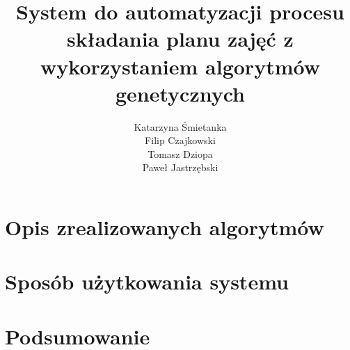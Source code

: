 \documentclass[11pt]{report}
\title{System do automatyzacji procesu składania planu zajęć z wykorzystaniem algorytmów genetycznych}
\author{
	Katarzyna Śmietanka \\
	Filip Czajkowski \\
	Tomasz Dziopa\\
	Paweł Jastrzębski
}
\begin{document}
%
%

\maketitle
\tableofcontents









\chapter{Opis zrealizowanych algorytmów}








\chapter{Sposób użytkowania systemu}
\chapter{Podsumowanie}
\end{document}
